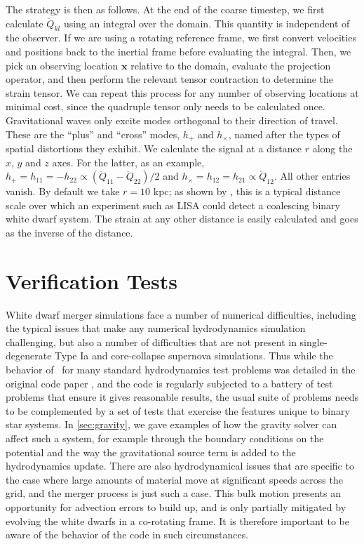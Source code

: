 \documentclass[12pt]{article}
\begin{document}
The strategy is then as follows. At the end of the coarse timestep, we first calculate $\ddot{Q}_{kl}$
using an integral over the domain. This quantity is independent of the observer. If we
are using a rotating reference frame, we first convert velocities and positions back to the inertial
frame before evaluating the integral. Then,
we pick an observing location $\mathbf{x}$ relative to the domain, evaluate the projection operator,
and then perform the relevant tensor contraction to determine the strain tensor. We can
repeat this process for any number of observing locations at minimal cost, since the quadruple tensor
only needs to be calculated once. Gravitational waves only excite modes orthogonal to their
direction of travel. These are the ``plus'' and ``cross'' modes, $h_+$ and $h_\times$, named after
the types of spatial distortions they exhibit. We calculate the signal at a distance $r$ along
the $x$, $y$ and $z$ axes. For the latter, as an example, $h_{+} = h_{11} = -h_{22} \propto (\ddot{Q}_{11} - \ddot{Q}_{22})/2$ and
$h_{\times} = h_{12} = h_{21} \propto \ddot{Q}_{12}$. All other entries vanish. By default we take $r = 10$ kpc;
as shown by \citet{loren-aguilar:2005}, this is a typical distance scale over which an
experiment such as LISA could detect a coalescing binary white dwarf system.
The strain at any other distance is easily calculated and goes as the inverse of the distance.



\newpage
\section{Verification Tests}
\label{sec:verification}

White dwarf merger simulations face a number of numerical difficulties,
including the typical issues that make any numerical hydrodynamics simulation
challenging, but also a number of difficulties that are
not present in single-degenerate Type Ia and core-collapse supernova
simulations.  Thus while the behavior of \castro\ for many standard hydrodynamics
test problems was detailed in the original code paper \citep{castro}, and the code
is regularly subjected to a battery of test problems that ensure it gives reasonable
results, the usual suite of problems needs to be complemented by a set of tests
that exercise the features unique to binary star systems. In \autoref{sec:gravity},
we gave examples of how the gravity solver can affect such a system, for example
through the boundary conditions on the potential and the way the gravitational source
term is added to the hydrodynamics update. There are also hydrodynamical issues that
are specific to the case where large amounts of material move at significant speeds
across the grid, and the merger process is just such a case. This bulk motion presents
an opportunity for advection errors to build up, and is only partially mitigated by
evolving the white dwarfs in a co-rotating frame. It is therefore important to be
aware of the behavior of the code in such circumstances.
\end{document}
